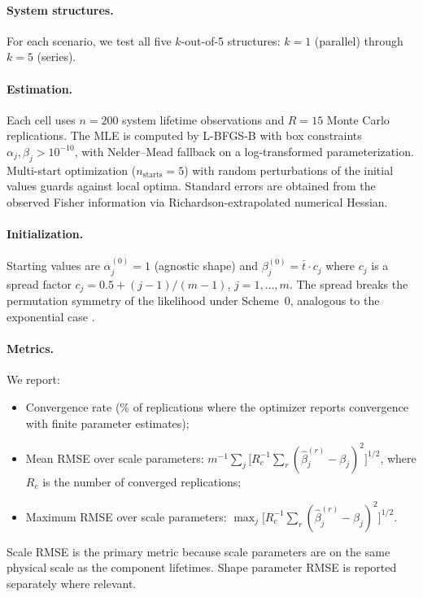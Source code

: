 \documentclass[12pt]{article}
\theoremstyle{definition}
\theoremstyle{remark}
\begin{document}
\paragraph{System structures.}
For each scenario, we test all five $k$-out-of-5 structures:
$k = 1$ (parallel) through $k = 5$ (series).

\paragraph{Estimation.}
Each cell uses $n = 200$ system lifetime observations and
$R = 15$ Monte Carlo replications.  The MLE is computed by
L-BFGS-B with box constraints $\alpha_j, \beta_j > 10^{-10}$,
with Nelder--Mead \citep{NelderMead1965} fallback on a
log-transformed parameterization.  Multi-start optimization
($n_{\text{starts}} = 5$) with random perturbations of the initial
values guards against local optima.  Standard errors are obtained
from the observed Fisher information via Richardson-extrapolated
numerical Hessian.

\paragraph{Initialization.}
Starting values are $\alpha_j^{(0)} = 1$ (agnostic shape) and
$\beta_j^{(0)} = \bar{t} \cdot c_j$ where $c_j$ is a spread
factor $c_j = 0.5 + (j-1)/(m-1)$, $j = 1, \ldots, m$.  The
spread breaks the permutation symmetry of the likelihood under
Scheme~0, analogous to the exponential case \citep{Towell2026}.

\paragraph{Metrics.}
We report:
\begin{itemize}
\item Convergence rate (\% of replications where the optimizer
  reports convergence with finite parameter estimates);
\item Mean RMSE over scale parameters:
  $m^{-1} \sum_j \bigl[R_c^{-1}
  \sum_r (\hat\beta_{j}^{(r)} - \beta_j)^2\bigr]^{1/2}$,
  where $R_c$ is the number of converged replications;
\item Maximum RMSE over scale parameters:
  $\max_j \bigl[R_c^{-1}
  \sum_r (\hat\beta_{j}^{(r)} - \beta_j)^2\bigr]^{1/2}$.
\end{itemize}
Scale RMSE is the primary metric because scale parameters are on
the same physical scale as the component lifetimes.  Shape
parameter RMSE is reported separately where relevant.
\end{document}
